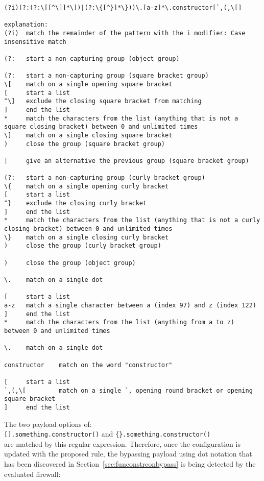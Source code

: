 \begin{lstlisting}[style=basicStyle, caption=regex of proposed rule id:2, label={lst:constructorsruleproposalregex}]
(?i)(?:(?:\[[^\]]*\])|(?:\{[^}]*\}))\.[a-z]*\.constructor[`,(,\[]

explanation:
(?i)  match the remainder of the pattern with the i modifier: Case insensitive match

(?:   start a non-capturing group (object group)

(?:   start a non-capturing group (square bracket group)
\[    match on a single opening square bracket
[     start a list
^\]   exclude the closing square bracket from matching
]     end the list
*     match the characters from the list (anything that is not a square closing bracket) between 0 and unlimited times
\]    match on a single closing square bracket
)     close the group (square bracket group)

|     give an alternative the previous group (square bracket group)

(?:	  start a non-capturing group (curly bracket group)
\{	  match on a single opening curly bracket
[     start a list
^}	  exclude the closing curly bracket
]     end the list
*     match the characters from the list (anything that is not a curly closing bracket) between 0 and unlimited times
\}	  match on a single closing curly bracket
)     close the group (curly bracket group)

)     close the group (object group)

\.    match on a single dot

[     start a list
a-z   match a single character between a (index 97) and z (index 122)
]     end the list
*     match the characters from the list (anything from a to z) between 0 and unlimited times

\.	  match on a single dot

constructor    match on the word "constructor"

[     start a list
`,(,\[         match on a single `, opening round bracket or opening square bracket
]     end the list
\end{lstlisting}

The two payload options of: \\
\verb|[].something.constructor()| and \verb|{}.something.constructor()| \\
are matched by this regular expression. Therefore, once the configuration is updated with the proposed rule, the bypassing payload using dot notation that has been discovered in Section~\ref{sec:funconstrconbypass} is being detected by the evaluated firewall:

